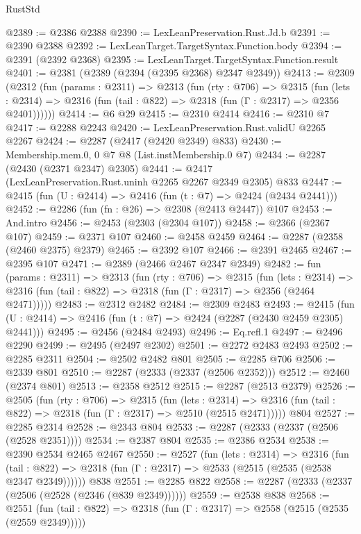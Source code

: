 \begin{lexlean}{RustStd}
\begin{coremodule}
@2389 := @2386 @2388
@2390 := LexLeanPreservation.Rust.Jd.b
@2391 := @2390 @2388
@2392 := LexLeanTarget.TargetSyntax.Function.body
@2394 := @2391 (@2392 @2368)
@2395 := LexLeanTarget.TargetSyntax.Function.result
@2401 := @2381 (@2389 (@2394 (@2395 @2368) @2347 @2349))
@2413 := @2309
    (@2312
      (fun (params : @2311) =>
      @2313
        (fun (rty : @706) =>
        @2315
          (fun (lets : @2314) =>
          @2316 (fun (tail : @822) => @2318 (fun (Γ : @2317) => @2356 @2401))))))
@2414 := @6 @29
@2415 := @2310 @2414
@2416 := @2310 @7
@2417 := @2288 @2243
@2420 := LexLeanPreservation.Rust.validU @2265 @2267
@2424 := @2287 (@2417 (@2420 @2349) @833)
@2430 := Membership.mem.{0, 0} @7 @8 (List.instMembership.{0} @7)
@2434 := @2287 (@2430 (@2371 @2347) @2305)
@2441 := @2417 (LexLeanPreservation.Rust.uninh @2265 @2267 @2349 @2305) @833
@2447 := @2415 (fun (U : @2414) => @2416 (fun (t : @7) => @2424 (@2434 @2441)))
@2452 := @2286 (fun (fn : @26) => @2308 (@2413 @2447)) @107
@2453 := And.intro
@2456 := @2453 (@2303 (@2304 @107))
@2458 := @2366 (@2367 @107)
@2459 := @2371 @107
@2460 := @2458 @2459
@2464 := @2287 (@2358 (@2460 @2375) @2379)
@2465 := @2392 @107
@2466 := @2391 @2465
@2467 := @2395 @107
@2471 := @2389 (@2466 @2467 @2347 @2349)
@2482 := fun (params : @2311) =>
  @2313
    (fun (rty : @706) =>
    @2315
      (fun (lets : @2314) =>
      @2316 (fun (tail : @822) => @2318 (fun (Γ : @2317) => @2356 (@2464 @2471)))))
@2483 := @2312 @2482
@2484 := @2309 @2483
@2493 := @2415 (fun (U : @2414) => @2416 (fun (t : @7) => @2424 (@2287 (@2430 @2459 @2305) @2441)))
@2495 := @2456 (@2484 @2493)
@2496 := Eq.refl.{1}
@2497 := @2496 @2290
@2499 := @2495 (@2497 @2302)
@2501 := @2272 @2483 @2493
@2502 := @2285 @2311
@2504 := @2502 @2482 @801
@2505 := @2285 @706
@2506 := @2339 @801
@2510 := @2287 (@2333 (@2337 (@2506 @2352)))
@2512 := @2460 (@2374 @801)
@2513 := @2358 @2512
@2515 := @2287 (@2513 @2379)
@2526 := @2505
    (fun (rty : @706) =>
    @2315
      (fun (lets : @2314) =>
      @2316 (fun (tail : @822) => @2318 (fun (Γ : @2317) => @2510 (@2515 @2471)))))
    @804
@2527 := @2285 @2314
@2528 := @2343 @804
@2533 := @2287 (@2333 (@2337 (@2506 (@2528 @2351))))
@2534 := @2387 @804
@2535 := @2386 @2534
@2538 := @2390 @2534 @2465 @2467
@2550 := @2527
    (fun (lets : @2314) =>
    @2316
      (fun (tail : @822) => @2318 (fun (Γ : @2317) => @2533 (@2515 (@2535 (@2538 @2347 @2349))))))
    @838
@2551 := @2285 @822
@2558 := @2287 (@2333 (@2337 (@2506 (@2528 (@2346 (@839 @2349))))))
@2559 := @2538 @838
@2568 := @2551
    (fun (tail : @822) => @2318 (fun (Γ : @2317) => @2558 (@2515 (@2535 (@2559 @2349)))))

\end{coremodule}
\end{lexlean}
